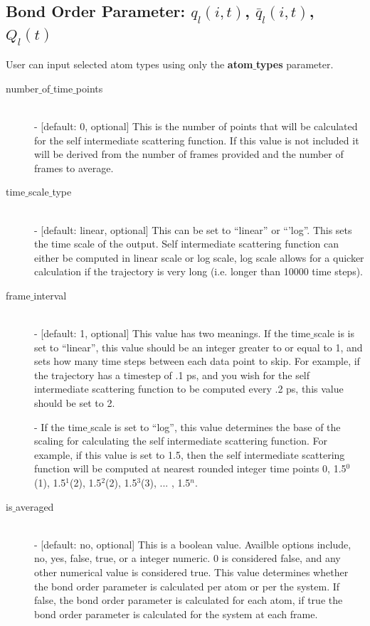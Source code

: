 \documentclass{article}
\begin{document}
\subsection{Bond Order Parameter: $q_l(i,t)$, $\bar{q}_l(i,t)$, $Q_l(t)$} \label{sec::BOP_parm}
User can input selected atom types using only the \textbf{atom$\_$types} parameter.
\begin{description}	
	\item[number$\_$of$\_$time$\_$points]\hfill \\
	- [default: 0, optional] This is the number of points that will be calculated for the self intermediate scattering function.  If this value is not included it will be derived from the number of frames provided and the number of frames to average.
	
	\item[time$\_$scale$\_$type] \hfill \\
	- [default: linear, optional] This can be set to ``linear'' or ``'log''.  This sets the time scale of the output. Self intermediate scattering function can either be computed in linear scale or log scale, log scale allows for a quicker calculation if the trajectory is very long (i.e. longer than 10000 time steps).
	
	\item[frame$\_$interval] \hfill \\
	- [default: 1, optional] This value has two meanings.  If the time$\_$scale is is set to ``linear'', this value should be an integer greater to or equal to 1, and sets how many time steps between each data point to skip.  For example, if the trajectory has a timestep of .1 ps, and you wish for the self intermediate scattering function to be computed every .2 ps, this value should be set to 2. 
	
	- If the time$\_$scale is set to ``log'', this value determines the base of the scaling for calculating the self intermediate scattering function.  For example, if this value is set to 1.5, then the self intermediate scattering function will be computed at nearest rounded integer time points 0, 1.5$^0$(1), 1.5$^1$(2), 1.5$^2$(2), 1.5$^3$(3), ... , 1.5$^{n}$. 
	
	\item[is$\_$averaged] \hfill \\
	- [default: no, optional]  This is a boolean value.  Availble options include, no, yes, false, true, or a integer numeric.  0 is considered false, and any other numerical value is considered true.  This value determines whether the bond order parameter is calculated per atom or per the system.  If false, the bond order parameter is calculated for each atom, if true the bond order parameter is calculated for the system at each frame.
	

\end{description}
\end{document}
